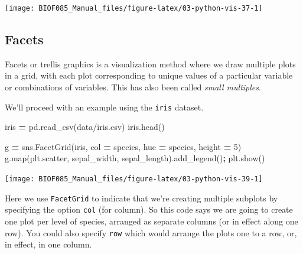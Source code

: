 \documentclass[
  letterpaper,
]{scrbook}
\newenvironment{Shaded}{\begin{snugshade}}{\end{snugshade}}
\newcommand{\BuiltInTok}[1]{#1}
\newcommand{\DecValTok}[1]{\textcolor[rgb]{0.00,0.00,0.81}{#1}}
\newcommand{\NormalTok}[1]{#1}
\newcommand{\OperatorTok}[1]{\textcolor[rgb]{0.81,0.36,0.00}{\textbf{#1}}}
\newcommand{\StringTok}[1]{\textcolor[rgb]{0.31,0.60,0.02}{#1}}
\begin{document}
\begin{center}\texttt{[image: BIOF085\_Manual\_files/figure-latex/03-python-vis-37-1]} \end{center}

\hypertarget{facets}{%
\subsection{Facets}\label{facets}}

Facets or trellis graphics is a visualization method where we draw multiple plots in a grid, with each plot corresponding to unique values of a particular variable or combinations of variables. This has also been called \emph{small multiples}.

We'll proceed with an example using the \texttt{iris} dataset.

\begin{Shaded}
\begin{Highlighting}[]
\NormalTok{iris }\OperatorTok{=}\NormalTok{ pd.read\_csv(}\StringTok{\textquotesingle{}data/iris.csv\textquotesingle{}}\NormalTok{)}
\NormalTok{iris.head()}
\end{Highlighting}
\end{Shaded}

\begin{Shaded}
\begin{Highlighting}[]
\NormalTok{g }\OperatorTok{=}\NormalTok{ sns.FacetGrid(iris, col }\OperatorTok{=} \StringTok{\textquotesingle{}species\textquotesingle{}}\NormalTok{, hue }\OperatorTok{=} \StringTok{\textquotesingle{}species\textquotesingle{}}\NormalTok{, height }\OperatorTok{=} \DecValTok{5}\NormalTok{)}
\NormalTok{g.}\BuiltInTok{map}\NormalTok{(plt.scatter, }\StringTok{\textquotesingle{}sepal\_width\textquotesingle{}}\NormalTok{, }\StringTok{\textquotesingle{}sepal\_length\textquotesingle{}}\NormalTok{).add\_legend()}\OperatorTok{;}
\NormalTok{plt.show()}
\end{Highlighting}
\end{Shaded}

\begin{center}\texttt{[image: BIOF085\_Manual\_files/figure-latex/03-python-vis-39-1]} \end{center}

Here we use \texttt{FacetGrid} to indicate that we're creating multiple subplots by specifying the option \texttt{col} (for column). So this code says we are going to create one plot per level of species, arranged as separate columns (or in effect along one row). You could also specify \texttt{row} which would arrange the plots one to a row, or, in effect, in one column.
\end{document}
